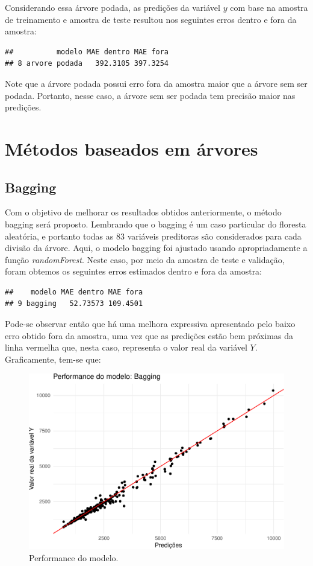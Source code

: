 \documentclass[11pt,]{article}
\begin{document}
Considerando essa árvore podada, as predições da variável \(y\) com base
na amostra de treinamento e amostra de teste resultou nos seguintes
erros dentro e fora da amostra:

\begin{verbatim}
##          modelo MAE dentro MAE fora
## 8 arvore podada   392.3105 397.3254
\end{verbatim}

\noindent Note que a árvore podada possui erro fora da amostra maior que
a árvore sem ser podada. Portanto, nesse caso, a árvore sem ser podada
tem precisão maior nas predições.

\hypertarget{muxe9todos-baseados-em-uxe1rvores-1}{%
\section{Métodos baseados em
árvores}\label{muxe9todos-baseados-em-uxe1rvores-1}}

\hypertarget{bagging-1}{%
\subsection{Bagging}\label{bagging-1}}

Com o objetivo de melhorar os resultados obtidos anteriormente, o método
bagging será proposto. Lembrando que o bagging é um caso particular do
floresta aleatória, e portanto todas as \(83\) variáveis preditoras são
considerados para cada divisão da árvore. Aqui, o modelo bagging foi
ajustado usando apropriadamente a função \textit{randomForest}. Neste
caso, por meio da amostra de teste e validação, foram obtemos os
seguintes erros estimados dentro e fora da amostra:

\begin{verbatim}
##    modelo MAE dentro MAE fora
## 9 bagging   52.73573 109.4501
\end{verbatim}

\noindent Pode-se observar então que há uma melhora expressiva
apresentado pelo baixo erro obtido fora da amostra, uma vez que as
predições estão bem próximas da linha vermelha que, nesta caso,
representa o valor real da variável \(Y\). Graficamente, tem-se que:

\begin{figure}

{\centering \includegraphics[width=0.6\linewidth]{figs/unnamed-chunk-17} 

}

\caption{Performance do modelo.}\label{fig:unnamed-chunk-17}
\end{figure}
\end{document}

